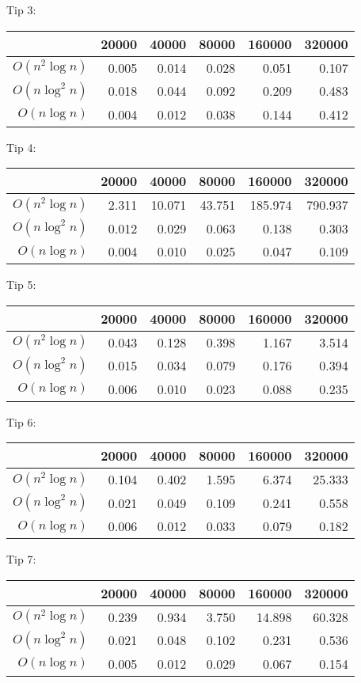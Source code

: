 Tip 3:

\begin{tabular}{r|r|r|r|r|r}
                & 20000 & 40000 & 80000 & 160000 & 320000 \\
\hline
$O(n^2 \log n)$ & 0.005 & 0.014 & 0.028 & 0.051 & 0.107  \\
\hline
$O(n \log^2 n)$ & 0.018 & 0.044 & 0.092 & 0.209 & 0.483  \\
\hline
$O(n \log n)$ & 0.004 & 0.012 & 0.038 & 0.144 & 0.412  \\
\end{tabular}

Tip 4:

\begin{tabular}{r|r|r|r|r|r}
                & 20000 & 40000 & 80000 & 160000 & 320000 \\
\hline
$O(n^2 \log n)$ & 2.311 & 10.071 & 43.751 & 185.974 & 790.937  \\
\hline
$O(n \log^2 n)$ & 0.012 & 0.029 & 0.063 & 0.138 & 0.303  \\
\hline
$O(n \log n)$ & 0.004 & 0.010 & 0.025 & 0.047 & 0.109  \\
\end{tabular}

Tip 5:

\begin{tabular}{r|r|r|r|r|r}
                & 20000 & 40000 & 80000 & 160000 & 320000 \\
\hline
$O(n^2 \log n)$ & 0.043 & 0.128 & 0.398 & 1.167 & 3.514  \\
\hline
$O(n \log^2 n)$ & 0.015 & 0.034 & 0.079 & 0.176 & 0.394  \\
\hline
$O(n \log n)$ & 0.006 & 0.010 & 0.023 & 0.088 & 0.235  \\
\end{tabular}

Tip 6:

\begin{tabular}{r|r|r|r|r|r}
                & 20000 & 40000 & 80000 & 160000 & 320000 \\
\hline
$O(n^2 \log n)$ & 0.104 & 0.402 & 1.595 & 6.374 & 25.333  \\
\hline
$O(n \log^2 n)$ & 0.021 & 0.049 & 0.109 & 0.241 & 0.558  \\
\hline
$O(n \log n)$ & 0.006 & 0.012 & 0.033 & 0.079 & 0.182  \\
\end{tabular}

Tip 7:

\begin{tabular}{r|r|r|r|r|r}
                & 20000 & 40000 & 80000 & 160000 & 320000 \\
\hline
$O(n^2 \log n)$ & 0.239 & 0.934 & 3.750 & 14.898 & 60.328  \\
\hline
$O(n \log^2 n)$ & 0.021 & 0.048 & 0.102 & 0.231 & 0.536  \\
\hline
$O(n \log n)$ & 0.005 & 0.012 & 0.029 & 0.067 & 0.154  \\
\end{tabular}

